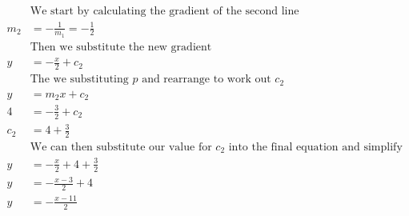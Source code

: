 \documentclass[a4paper]{article}
\begin{document}
\begin{align*}
	&\text{We start by calculating the gradient of the second line}\\
	m_2 &= -\frac{1}{m_1} = -\frac{1}{2}\\
	&\text{Then we substitute the new gradient}\\
	y &= -\frac{x}{2} + c_2\\
	&\text{The we substituting $p$ and rearrange to work out $c_2$}\\
	y &= m_2x + c_2\\
	4 &=  -\frac{3}{2} + c_2 \\
	c_2 &= 4 + \frac{3}{2}\\
	&\text{We can then substitute our value for $c_2$ into the final equation and simplify}\\
	y &= -\frac{x}{2} + 4 + \frac{3}{2}\\
	y &= -\frac{x - 3}{2} + 4\\
	y &= -\frac{x - 11}{2}
\end{align*}
\end{document}
